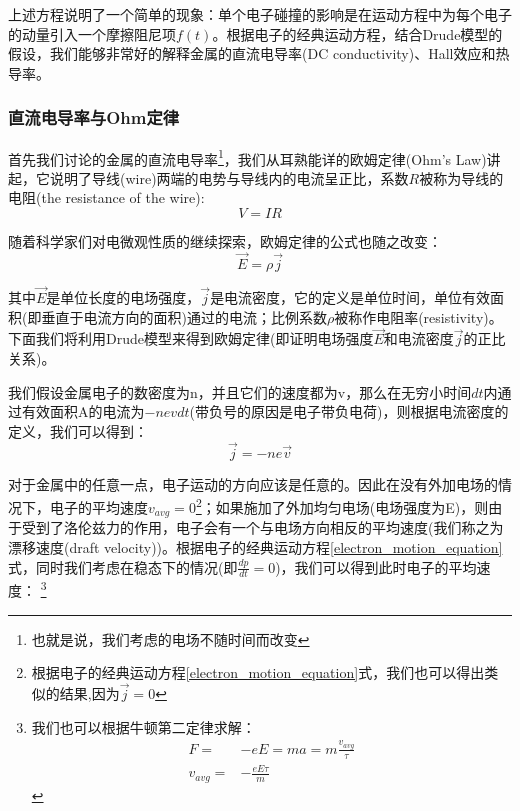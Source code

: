 \documentclass{ctexart}
\begin{document}
            上述方程说明了一个简单的现象：单个电子碰撞的影响是在运动方程中为每个电子的动量引入一个摩擦阻尼项$f(t)$。根据电子的经典运动方程，结合Drude模型的假设，我们能够非常好的解释金属的直流电导率(DC conductivity)、Hall效应和热导率。
            
            \subsubsection{直流电导率与Ohm定律}
            
            首先我们讨论的金属的直流电导率\footnote{也就是说，我们考虑的电场不随时间而改变}，我们从耳熟能详的欧姆定律(Ohm's Law)讲起，它说明了导线(wire)两端的电势与导线内的电流呈正比，系数$R$被称为导线的电阻(the resistance of the wire):
            \begin{equation}
                V=IR
            \end{equation}
            
            随着科学家们对电微观性质的继续探索，欧姆定律的公式也随之改变：
            \begin{equation}\label{equ:Ohm'sLaw}
                \vec{E}=\rho \vec{j}
            \end{equation}
            
            其中$\vec{E}$是单位长度的电场强度，$\vec{j}$是电流密度，它的定义是单位时间，单位有效面积(即垂直于电流方向的面积)通过的电流；比例系数$\rho$被称作电阻率(resistivity)。下面我们将利用Drude模型来得到欧姆定律(即证明电场强度$\vec{E}$和电流密度$\vec{j}$的正比关系)。
            
            我们假设金属电子的数密度为n，并且它们的速度都为v，那么在无穷小时间$dt$内通过有效面积A的电流为$-nevdt$(带负号的原因是电子带负电荷)，则根据电流密度的定义，我们可以得到：
            \begin{equation}\label{currentdensity}
                \vec{j}=-ne\vec{v}
            \end{equation}
            
            对于金属中的任意一点，电子运动的方向应该是任意的。因此在没有外加电场的情况下，电子的平均速度$v_{avg}=0$\footnote{根据电子的经典运动方程\eqref{electron_motion_equation}式，我们也可以得出类似的结果,因为$\vec{j}=0$}；如果施加了外加均匀电场(电场强度为E)，则由于受到了洛伦兹力的作用，电子会有一个与电场方向相反的平均速度(我们称之为漂移速度(draft velocity))。根据电子的经典运动方程\eqref{electron_motion_equation}式，同时我们考虑在稳态下的情况(即$\frac{dp}{dt}=0$)，我们可以得到此时电子的平均速度：
            \footnote{我们也可以根据牛顿第二定律求解：\begin{align*}
                    F=&-eE=ma=m\frac{v_{avg}}{\tau}\\
                    v_{avg}=&-\frac{eE\tau}{m}
            \end{align*}}
            
\end{document}
